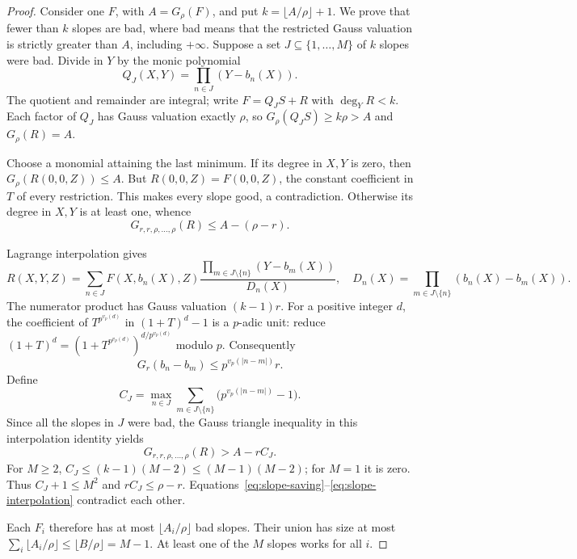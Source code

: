 \begin{proof}
Consider one $F$, with $A=G_\rho(F)$, and put
$k=\lfloor A/\rho\rfloor+1$. We prove that fewer than $k$ slopes are bad,
where bad means that the restricted Gauss valuation is strictly greater
than $A$, including $+\infty$.
Suppose a set $J\subseteq\{1,\ldots,M\}$ of $k$ slopes were bad. Divide in
$Y$ by the monic polynomial
\[
 Q_J(X,Y)=\prod_{n\in J}(Y-b_n(X)).
\]
The quotient and remainder are integral; write $F=Q_JS+R$ with
$\deg_Y R<k$. Each factor of $Q_J$ has Gauss valuation exactly $\rho$,
so $G_\rho(Q_JS)\ge k\rho>A$ and $G_\rho(R)=A$.

Choose a monomial attaining the last minimum. If its degree in $X,Y$ is
zero, then $G_\rho(R(0,0,Z))\le A$. But
$R(0,0,Z)=F(0,0,Z)$, the constant coefficient in $T$ of every restriction.
This makes every slope good, a contradiction. Otherwise its degree in
$X,Y$ is at least one, whence
\begin{equation}\label{eq:slope-saving}
 G_{r,r,\rho,\ldots,\rho}(R)\le A-(\rho-r).
\end{equation}

Lagrange interpolation gives
\[
 R(X,Y,Z)=\sum_{n\in J}F(X,b_n(X),Z)
   \frac{\prod_{m\in J\setminus\{n\}}(Y-b_m(X))}{D_n(X)},
 \quad
 D_n(X)=\prod_{m\in J\setminus\{n\}}(b_n(X)-b_m(X)).
\]
The numerator product has Gauss valuation $(k-1)r$. For a positive
integer $d$, the coefficient of $T^{p^{v_p(d)}}$ in
$(1+T)^d-1$ is a $p$-adic unit: reduce
$(1+T)^d=(1+T^{p^{v_p(d)}})^{d/p^{v_p(d)}}$ modulo $p$.
Consequently
\[
 G_r(b_n-b_m)\le p^{v_p(|n-m|)}r.
\]
Define
\[
 C_J=\max_{n\in J}
 \sum_{m\in J\setminus\{n\}}\bigl(p^{v_p(|n-m|)}-1\bigr).
\]
Since all the slopes in $J$ were bad, the Gauss triangle inequality in
this interpolation identity yields
\begin{equation}\label{eq:slope-interpolation}
 G_{r,r,\rho,\ldots,\rho}(R)>A-rC_J.
\end{equation}
For $M\ge2$,
$C_J\le(k-1)(M-2)\le(M-1)(M-2)$; for $M=1$ it is zero.
Thus $C_J+1\le M^2$ and $rC_J\le\rho-r$.
Equations~\eqref{eq:slope-saving}--\eqref{eq:slope-interpolation}
contradict each other.

Each $F_i$ therefore has at most $\lfloor A_i/\rho\rfloor$ bad slopes.
Their union has size at most
$\sum_i\lfloor A_i/\rho\rfloor\le\lfloor B/\rho\rfloor=M-1$.
At least one of the $M$ slopes works for all $i$.
\end{proof}

